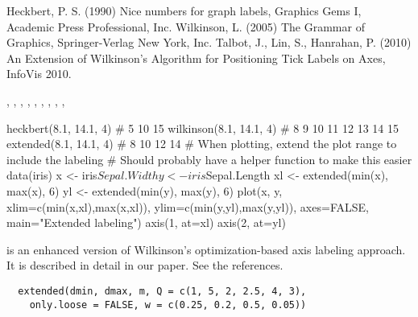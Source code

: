 \documentclass[letterpaper]{book}
\begin{document}
%
\begin{References}\relax
Heckbert, P. S. (1990) Nice numbers for graph labels,
Graphics Gems I, Academic Press Professional, Inc.
Wilkinson, L. (2005) The Grammar of Graphics,
Springer-Verlag New York, Inc. Talbot, J., Lin, S.,
Hanrahan, P. (2010) An Extension of Wilkinson's Algorithm
for Positioning Tick Labels on Axes, InfoVis 2010.
\end{References}
%
\begin{SeeAlso}\relax
{}, ,
, ,
, ,
, ,
, 
\end{SeeAlso}
%
\begin{Examples}
\begin{ExampleCode}
heckbert(8.1, 14.1, 4)	# 5 10 15
wilkinson(8.1, 14.1, 4)	# 8 9 10 11 12 13 14 15
extended(8.1, 14.1, 4)	# 8 10 12 14
# When plotting, extend the plot range to include the labeling
# Should probably have a helper function to make this easier
data(iris)
x <- iris$Sepal.Width
y <- iris$Sepal.Length
xl <- extended(min(x), max(x), 6)
yl <- extended(min(y), max(y), 6)
plot(x, y,
    xlim=c(min(x,xl),max(x,xl)),
    ylim=c(min(y,yl),max(y,yl)),
    axes=FALSE, main="Extended labeling")
axis(1, at=xl)
axis(2, at=yl)
\end{ExampleCode}
\end{Examples}
%
\begin{Description}\relax
{} is an enhanced version of Wilkinson's
optimization-based axis labeling approach. It is
described in detail in our paper. See the references.
\end{Description}
%
\begin{Usage}
\begin{verbatim}
  extended(dmin, dmax, m, Q = c(1, 5, 2, 2.5, 4, 3),
    only.loose = FALSE, w = c(0.25, 0.2, 0.5, 0.05))
\end{verbatim}
\end{Usage}
%
\end{document}
